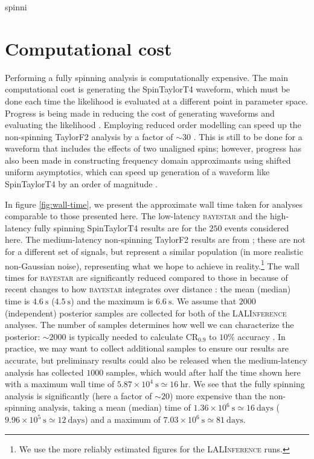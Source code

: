 spinni\appendix

\section{Computational cost}\label{ap:CPU}

Performing a fully spinning analysis is computationally expensive. The main computational cost is generating the SpinTaylorT4 waveform, which must be done each time the likelihood is evaluated at a different point in parameter space. Progress is being made in reducing the cost of generating waveforms and evaluating the likelihood \citep[e.g.,][]{Canizares_2013,P_rrer_2014}. Employing reduced order modelling can speed up the non-spinning TaylorF2 analysis by a factor of $\sim 30$ \citep{Canizares_2015}. This is still to be done for a waveform that includes the effects of two unaligned spins; however, progress has also been made in constructing frequency domain approximants using shifted uniform asymptotics, which can speed up generation of a waveform like SpinTaylorT4 by an order of magnitude \citep{Klein:2014bua}.

In figure \ref{fig:wall-time}, we present the approximate wall time taken for analyses comparable to those presented here. The low-latency \textsc{bayestar} and the high-latency fully spinning SpinTaylorT4 results are for the $250$ events considered here. The medium-latency non-spinning TaylorF2 results are from \citet{Berry_2014}; these are not for a different set of signals, but represent a similar population (in more realistic non-Gaussian noise), representing what we hope to achieve in reality.\footnote{We use the more reliably estimated figures for the \textsc{LALInference} runs.} The wall times for \textsc{bayestar} are significantly reduced compared to those in \citet{Berry_2014} because of recent changes to how \textsc{bayestar} integrates over distance \citep{SingerPrice2015}: the mean (median) time is $4.6~\mathrm{s}$ ($4.5~\mathrm{s}$) and the maximum is $6.6~\mathrm{s}$.  We assume that $2000$ (independent) posterior samples are collected for both of the \textsc{LALInference} analyses. The number of samples determines how well we can characterize the posterior: $\sim2000$ is typically needed to calculate $\mathrm{CR}_{0.9}$ to $10\%$ accuracy \citep{DelPozzo_2015}. In practice, we may want to collect additional samples to ensure our results are accurate, but preliminary results could also be released when the medium-latency analysis has collected $1000$ samples, which would after half the time shown here with a maximum wall time of $5.87\times10^4~\mathrm{s} \simeq 16~\mathrm{hr}$. We see that the fully spinning analysis is significantly (here a factor of $\sim20$) more expensive than the non-spinning analysis, taking a mean (median) time of $1.36\times10^6~\mathrm{s} \simeq 16~\mathrm{days}$ ($9.96\times10^5~\mathrm{s} \simeq 12~\mathrm{days}$) and a maximum of $7.03\times10^6~\mathrm{s} \simeq 81~\mathrm{days}$.

